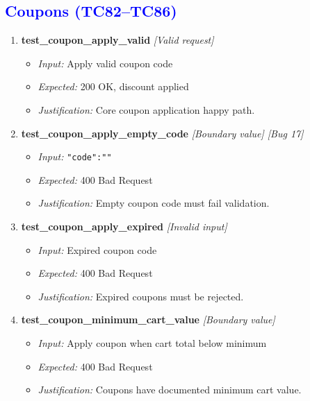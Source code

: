 \documentclass{article}
\begin{document}
\subsection*{\textcolor{blue}{Coupons (TC82--TC86)}}
\begin{enumerate}[resume, label=\textbf{TC\arabic*.}]

\item \textbf{test\_coupon\_apply\_valid} \textit{[Valid request]}
\begin{itemize}[noitemsep]
  \item \textit{Input:} Apply valid coupon code
  \item \textit{Expected:} 200 OK, discount applied
  \item \textit{Justification:} Core coupon application happy path.
\end{itemize}

\item \textbf{test\_coupon\_apply\_empty\_code} \textit{[Boundary value] \textit{[Bug 17]}}
\begin{itemize}[noitemsep]
  \item \textit{Input:} \texttt{"code":""}
  \item \textit{Expected:} 400 Bad Request
  \item \textit{Justification:} Empty coupon code must fail validation.
\end{itemize}

\item \textbf{test\_coupon\_apply\_expired} \textit{[Invalid input]}
\begin{itemize}[noitemsep]
  \item \textit{Input:} Expired coupon code
  \item \textit{Expected:} 400 Bad Request
  \item \textit{Justification:} Expired coupons must be rejected.
\end{itemize}

\item \textbf{test\_coupon\_minimum\_cart\_value} \textit{[Boundary value]}
\begin{itemize}[noitemsep]
  \item \textit{Input:} Apply coupon when cart total below minimum
  \item \textit{Expected:} 400 Bad Request
  \item \textit{Justification:} Coupons have documented minimum cart value.
\end{itemize}


\end{enumerate}
\end{document}
